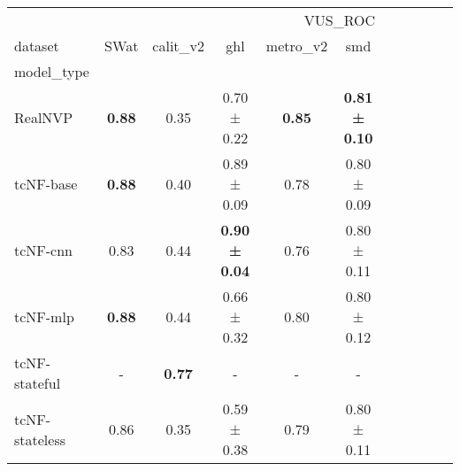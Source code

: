\begin{tabular}{l|ccccc|ccccc}
\toprule
 & \multicolumn{5}{r}{VUS_ROC} \\
dataset & SWat & calit_v2 & ghl & metro_v2 & smd \\
model_type &  &  &  &  &  \\
\midrule
RealNVP & \bfseries 0.88 & 0.35 & 0.70 ± 0.22 & \bfseries 0.85 & \bfseries 0.81 ± 0.10 \\
tcNF-base & \bfseries 0.88 & 0.40 & 0.89 ± 0.09 & 0.78 & 0.80 ± 0.09 \\
tcNF-cnn & 0.83 & 0.44 & \bfseries 0.90 ± 0.04 & 0.76 & 0.80 ± 0.11 \\
tcNF-mlp & \bfseries 0.88 & 0.44 & 0.66 ± 0.32 & 0.80 & 0.80 ± 0.12 \\
tcNF-stateful & - & \bfseries 0.77 & - & - & - \\
tcNF-stateless & 0.86 & 0.35 & 0.59 ± 0.38 & 0.79 & 0.80 ± 0.11 \\
\bottomrule
\end{tabular}
